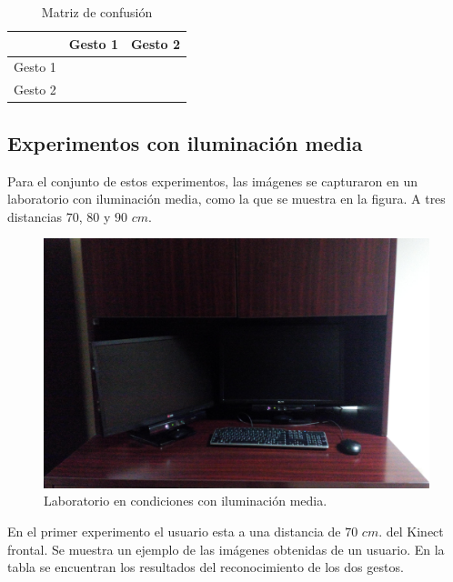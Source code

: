 \begin{table}[h!] 
\begin{center}
\begin{tabular}{ r || c | c |} 
 
        & Gesto 1 & Gesto 2 \\ \hline \hline  
Gesto 1 &      &       \\ \hline  
Gesto 2 &      &      \\   

\end{tabular}
\end{center} 
\caption{Matriz de confusión}
\end{table}


\subsection{Experimentos con iluminación media} 
Para el conjunto de estos experimentos, las imágenes se capturaron en un laboratorio con iluminación media, como la que se muestra en la figura. A tres distancias $70$, $80$ y $90$ $cm$.  

\begin{figure}[h!]
\begin{center} 
\includegraphics[scale=0.09]{./Figures/mediailuminacion.jpg}
\end{center}
\caption{Laboratorio en condiciones con iluminación media.}
\label{fig:LabMedioIluminado} 
\end{figure}  


En el primer experimento el usuario esta a una distancia de $70$ $cm.$ del Kinect frontal. Se muestra un ejemplo de las imágenes obtenidas de un usuario. En la tabla se encuentran los resultados del reconocimiento de los dos gestos.  

